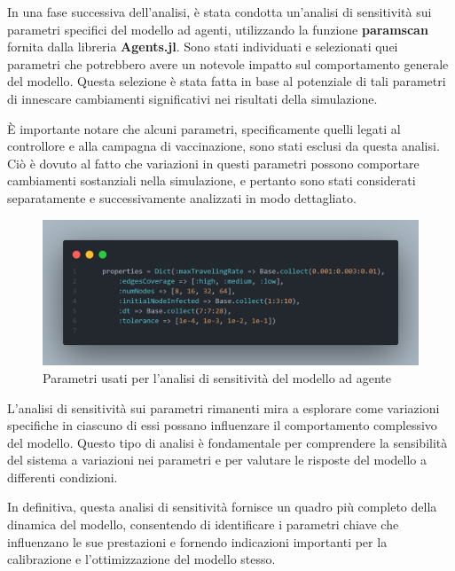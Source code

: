 In una fase successiva dell'analisi, è stata condotta un'analisi di 
sensitività sui parametri specifici del modello ad agenti, 
utilizzando la funzione \textbf{paramscan} fornita dalla libreria 
\textbf{Agents.jl}. Sono stati individuati e selezionati quei 
parametri che potrebbero avere un notevole impatto sul comportamento 
generale del modello. Questa selezione è stata fatta in base al 
potenziale di tali parametri di innescare cambiamenti significativi nei 
risultati della simulazione.

È importante notare che alcuni parametri, specificamente quelli 
legati al controllore e alla campagna di vaccinazione, sono stati 
esclusi da questa analisi. Ciò è dovuto al fatto che variazioni in 
questi parametri possono comportare cambiamenti sostanziali nella 
simulazione, e pertanto sono stati considerati separatamente e 
successivamente analizzati in modo dettagliato.

\begin{figure}[H]
    \begin{center}
		\includegraphics[width=\textwidth]{img/paramscan.png}
		\caption{Parametri usati per l'analisi di sensitività del modello ad agente}
		\label{fig:paramscan}
	\end{center}
\end{figure}

L'analisi di sensitività sui parametri rimanenti mira a esplorare 
come variazioni specifiche in ciascuno di essi possano influenzare 
il comportamento complessivo del modello. Questo tipo di analisi è 
fondamentale per comprendere la sensibilità del sistema a variazioni 
nei parametri e per valutare le risposte del modello a differenti 
condizioni.

In definitiva, questa analisi di sensitività fornisce un quadro più 
completo della dinamica del modello, consentendo di identificare i 
parametri chiave che influenzano le sue prestazioni e fornendo 
indicazioni importanti per la calibrazione e l'ottimizzazione del 
modello stesso.
\newpage

